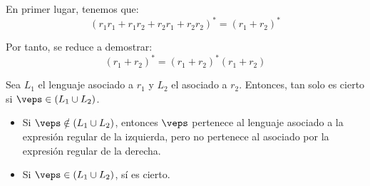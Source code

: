 \documentclass[12pt]{article}
\begin{document}
\begin{ejercicio}[1.25 puntos]
\begin{enumerate}
            En primer lugar, tenemos que:
            \begin{equation*}
                (r_1 r_1 + r_1 r_2 + r_2 r_1 + r_2 r_2)^*
                = (r_1 + r_2)^*
            \end{equation*}

            Por tanto, se reduce a demostrar:
            \begin{equation*}
                (r_1 + r_2)^* = (r_1 + r_2)^*(r_1 + r_2)
            \end{equation*}
            
            Sea $L_1$ el lenguaje asociado a $r_1$ y $L_2$ el asociado a $r_2$. Entonces, tan solo es cierto si $\veps\in (L_1\cup L_2)$.
            \begin{itemize}
                \item Si $\veps\notin (L_1\cup L_2)$, entonces $\veps$ pertenece al lenguaje asociado a la expresión regular de la izquierda, pero no pertenece al asociado por la expresión regular de la derecha.
                \item Si $\veps\in (L_1\cup L_2)$, sí es cierto.
            \end{itemize}
        \end{enumerate}
    \end{ejercicio}
\end{document}
